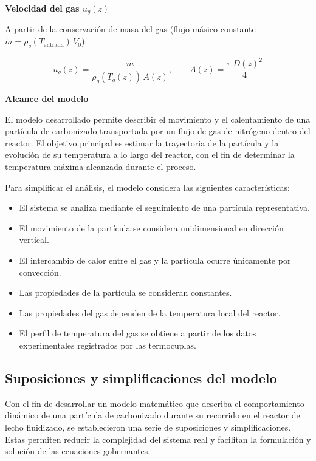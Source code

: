\documentclass[11pt,stdletter,orderfromtodate,sigleft,twoside]{report}
\begin{document}
\textbf{Velocidad del gas $u_g(z)$}

A partir de la conservación de masa del gas (flujo másico constante $\dot{m} = \rho_g(T_\text{entrada})\,\dot{V}_0$):

\begin{equation}
  u_g(z) = \frac{\dot{m}}{\rho_g\!\left(T_g(z)\right)\,A(z)}, \qquad A(z) = \frac{\pi\,D(z)^2}{4}
  \label{eq:ug}
\end{equation}
\medskip

\textbf{Alcance del modelo}

El modelo desarrollado permite describir el movimiento y el calentamiento de una partícula de carbonizado transportada por un flujo de gas de nitrógeno dentro del reactor. El objetivo principal es estimar la trayectoria de la partícula y la evolución de su temperatura a lo largo del reactor, con el fin de determinar la temperatura máxima alcanzada durante el proceso.

Para simplificar el análisis, el modelo considera las siguientes características:

\begin{itemize}
\item El sistema se analiza mediante el seguimiento de una partícula representativa.
\item El movimiento de la partícula se considera unidimensional en dirección vertical.
\item El intercambio de calor entre el gas y la partícula ocurre únicamente por convección.
\item Las propiedades de la partícula se consideran constantes.
\item Las propiedades del gas dependen de la temperatura local del reactor.
\item El perfil de temperatura del gas se obtiene a partir de los datos experimentales registrados por las termocuplas.
\end{itemize}
\medskip

\subsection{Suposiciones y simplificaciones del modelo}

Con el fin de desarrollar un modelo matemático que describa el comportamiento dinámico de una partícula de carbonizado durante su recorrido en el reactor de lecho fluidizado, se establecieron una serie de suposiciones y simplificaciones. Estas permiten reducir la complejidad del sistema real y facilitan la formulación y solución de las ecuaciones gobernantes.
\end{document}
